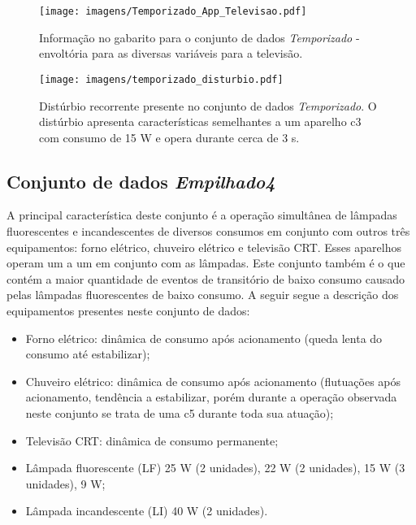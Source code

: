 \begin{sidewaysfigure}[p]
\centering
\texttt{[image: imagens/Temporizado\_App\_Televisao.pdf]}
\caption{Informação no gabarito para o conjunto de dados
\emph{Temporizado} - envoltória para as diversas variáveis para a
televisão.}
\label{fig:temporizado_televisao}
\end{sidewaysfigure}

\begin{sidewaysfigure}[p]
\centering
\texttt{[image: imagens/temporizado\_disturbio.pdf]}
\caption[Distúrbio recorrente presente no conjunto de dados \emph{Temporizado}.]
{Distúrbio recorrente presente no conjunto de dados
\emph{Temporizado}. O distúrbio apresenta características semelhantes
a um aparelho \acs{c3} com consumo de 15 W e opera durante cerca de
3 s.}
\label{fig:temporizado_disturbio}
\end{sidewaysfigure}

\FloatBarrier

\subsection{Conjunto de dados \emph{Empilhado4}}
\label{ssec:emp4}

A principal característica deste conjunto é a operação simultânea de
lâmpadas fluorescentes e incandescentes de diversos consumos em
conjunto com outros três equipamentos:
forno elétrico, chuveiro elétrico e televisão CRT. Esses aparelhos
operam um a um em conjunto com as lâmpadas. Este conjunto também é o
que contém a maior quantidade de eventos de transitório de baixo
consumo causado pelas lâmpadas fluorescentes de baixo consumo. A
seguir segue a descrição dos equipamentos presentes neste conjunto de
dados:

\begin{itemize}
\item Forno elétrico: dinâmica de consumo após acionamento (queda
lenta do consumo até estabilizar); 
\item Chuveiro elétrico: dinâmica de consumo após acionamento (flutuações
após acionamento, tendência a estabilizar, porém durante a operação
observada neste conjunto se trata de uma \acs{c5} durante toda sua
atuação);
\item Televisão CRT: dinâmica de consumo permanente;
\item Lâmpada fluorescente (LF) 25 W (2 unidades), 22 W (2 unidades), 15 W (3
unidades), 9 W;
\item Lâmpada incandescente (LI) 40 W (2 unidades).
\end{itemize}

